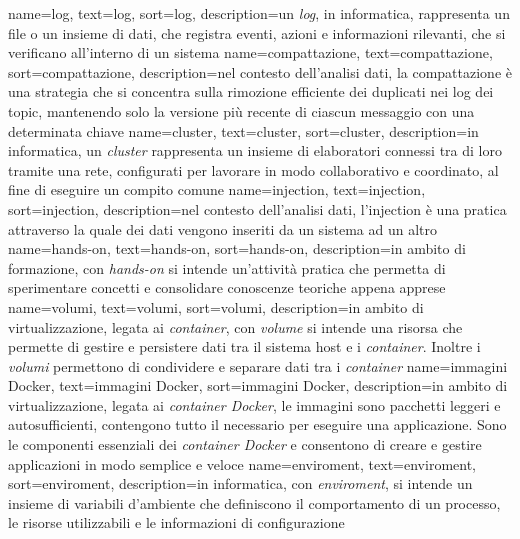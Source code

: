{
    name={log},
    text=log,
    sort=log,
    description={un \textit{log}, in informatica, rappresenta un file o un insieme di dati, che registra eventi, azioni e informazioni rilevanti, 
    che si verificano all'interno di un sistema}
}
{
    name={compattazione},
    text=compattazione,
    sort=compattazione,
    description={nel contesto dell'analisi dati, la compattazione è una strategia che si concentra sulla rimozione efficiente dei duplicati nei log dei topic, mantenendo solo la versione più recente di ciascun messaggio con una determinata chiave}
}
{
    name={cluster},
    text=cluster,
    sort=cluster,
    description={in informatica, un \textit{cluster} rappresenta un insieme di elaboratori connessi tra di loro tramite una rete, configurati 
    per lavorare in modo collaborativo e coordinato, al fine di eseguire un compito comune}
}
{
    name={injection},
    text=injection,
    sort=injection,
    description={nel contesto dell'analisi dati, l'injection è  una pratica attraverso la quale dei dati 
    vengono inseriti da un sistema ad un altro}
}
{
    name={hands-on},
    text=hands-on,
    sort=hands-on,
    description={in ambito di formazione, con \textit{hands-on} si intende un'attività pratica che permetta di sperimentare 
    concetti e consolidare conoscenze teoriche appena apprese}
}
{
    name={volumi},
    text=volumi,
    sort=volumi,
    description={in ambito di virtualizzazione, legata ai \textit{container}, con \textit{volume} si intende una risorsa che permette di gestire 
    e persistere dati tra il sistema host e i \textit{container}. Inoltre i \textit{volumi} permettono di condividere e separare 
    dati tra i \textit{container}}
}
{
    name={immagini Docker},
    text=immagini Docker,
    sort=immagini Docker,
    description={in ambito di virtualizzazione, legata ai \textit{container Docker}, le immagini sono pacchetti leggeri e autosufficienti,
    contengono tutto il necessario per eseguire una applicazione. Sono le componenti essenziali dei \textit{container Docker} e consentono di 
    creare e gestire applicazioni in modo semplice e veloce}
}
{
    name={enviroment},
    text=enviroment,
    sort=enviroment,
    description={in informatica, con \textit{enviroment}, si intende un insieme di variabili d'ambiente che definiscono il comportamento di un processo, le risorse utilizzabili e le informazioni di configurazione}
}
